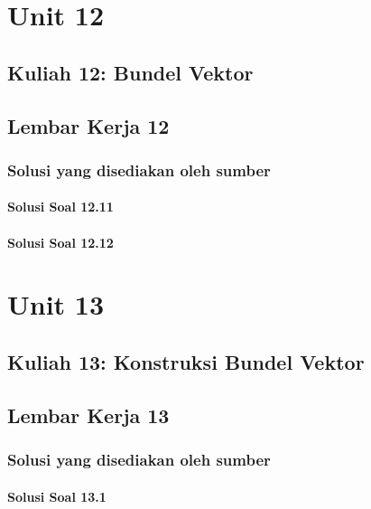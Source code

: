 \documentclass[11pt,a4paper,oneside]{book}
\begin{document}
\part{Unit 12}
\chapter[Kuliah 12]{Kuliah 12: Bundel Vektor}


\chapter{Lembar Kerja 12}


\section*{Solusi yang disediakan oleh sumber}
\subsection*{Solusi Soal 12.11}

\subsection*{Solusi Soal 12.12}


\part{Unit 13}
\chapter[Kuliah 13]{Kuliah 13: Konstruksi Bundel Vektor}


\chapter{Lembar Kerja 13}


\section*{Solusi yang disediakan oleh sumber}
\subsection*{Solusi Soal 13.1}

\end{document}
